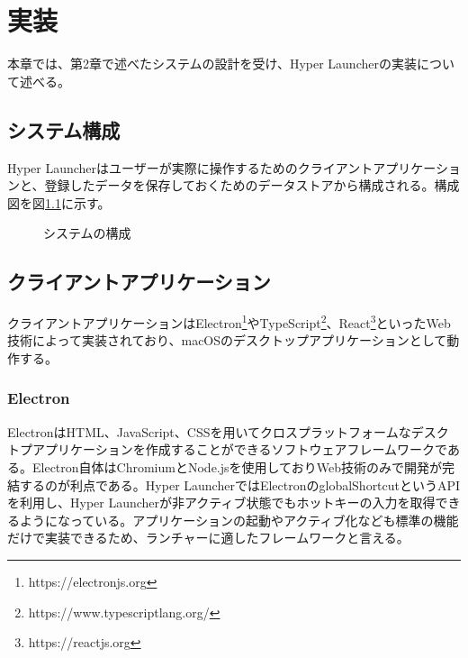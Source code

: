 \chapter{実装}
本章では、第2章で述べたシステムの設計を受け、Hyper Launcherの実装について述べる。

\newpage

\section{システム構成}
Hyper Launcherはユーザーが実際に操作するためのクライアントアプリケーションと、登録したデータを保存しておくためのデータストアから構成される。構成図を図\ref{fig:system}に示す。

\begin{figure}[h]
    \begin{center}
    \end{center}
    \caption{システムの構成}
    \label{fig:system}
\end{figure}

\section{クライアントアプリケーション}
クライアントアプリケーションはElectron\footnote{https://electronjs.org}やTypeScript\footnote{https://www.typescriptlang.org/}、React\footnote{https://reactjs.org}といったWeb技術によって実装されており、macOSのデスクトップアプリケーションとして動作する。

\subsection{Electron}
ElectronはHTML、JavaScript、CSSを用いてクロスプラットフォームなデスクトプアプリケーションを作成することができるソフトウェアフレームワークである。Electron自体はChromiumとNode.jsを使用しておりWeb技術のみで開発が完結するのが利点である。Hyper LauncherではElectronのglobalShortcutというAPIを利用し、Hyper Launcherが非アクティブ状態でもホットキーの入力を取得できるようになっている。アプリケーションの起動やアクティブ化なども標準の機能だけで実装できるため、ランチャーに適したフレームワークと言える。

